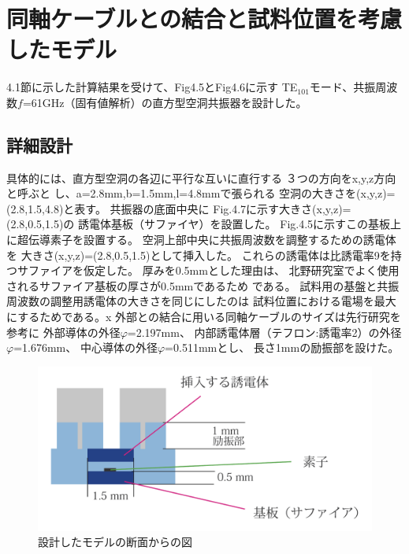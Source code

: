 \section{同軸ケーブルとの結合と試料位置を考慮したモデル}
4.1節に示した計算結果を受けて、Fig4.5とFig4.6に示す
TE$_{101}$モード、共振周波数$f$=61GHz（固有値解析）の直方型空洞共振器を設計した。

\subsection*{詳細設計}
具体的には、直方型空洞の各辺に平行な互いに直行する
３つの方向をx,y,z方向と呼ぶと
し、a=2.8mm,b=1.5mm,l=4.8mmで張られる
空洞の大きさを(x,y,z)=(2.8,1.5,4.8)と表す。
共振器の底面中央に
Fig.4.7に示す大きさ(x,y,z)=(2.8,0.5,1.5)の
誘電体基板（サファイヤ）を設置した。
Fig.4.5に示すこの基板上に超伝導素子を設置する。
空洞上部中央に共振周波数を調整するための誘電体を
大きさ(x,y,z)=(2.8,0.5,1.5)として挿入した。
これらの誘電体は比誘電率9を持つサファイアを仮定した。
厚みを0.5mmとした理由は、
北野研究室でよく使用されるサファイア基板の厚さが0.5mmであるため
である。
試料用の基盤と共振周波数の調整用誘電体の大きさを同じにしたのは
試料位置における電場を最大にするためである。x
外部との結合に用いる同軸ケーブルのサイズは先行研究\cite{cQED}を参考に
外部導体の外径$φ$=2.197mm、
内部誘電体層（テフロン:誘電率2）の外径$φ$=1.676mm、
中心導体の外径$φ$=0.511mmとし、
長さ1mmの励振部を設けた。

\vspace{10 mm}

\begin{figure}[h]
  \begin{center}
    \includegraphics[width=12cm]{./image/newmodel.png}
    \caption{設計したモデルの断面からの図}
    \label{fig:Cavity}
  \end{center}
\end{figure}

